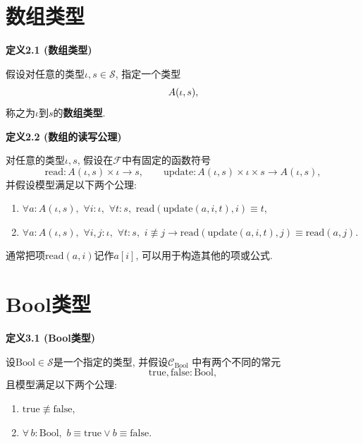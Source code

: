 \documentclass[UTF8]{ctexart}
\begin{document}
\section{数组类型}

\hypertarget{sec:定义2.1}{}
\noindent\textbf{定义2.1 (数组类型)}

假设对任意的类型$\iota,s\in\mathcal{S}$, 指定一个类型
\[
    A(\iota,s),\\[-3pt]
\]
称之为$\iota$到$s$的\textbf{数组类型}.

\vspace{10pt}

\hypertarget{sec:定义2.2}{}
\noindent\textbf{定义2.2 (数组的读写公理)}

对任意的类型$\iota,s$, 假设在$\mathcal{F}$中有固定的函数符号
\[
    \mathrm{read}:A(\iota,s)\times\iota\to s,\qquad
    \mathrm{update}:A(\iota,s)\times\iota\times s\to A(\iota,s),
\]
并假设模型满足以下两个公理:
\begin{enumerate}
    \item $\forall a:A(\iota,s),\,\,\forall i:\iota,\,\,\forall t:s,\,\,
    \mathrm{read}(\mathrm{update}(a,i,t),i)\equiv t$,
    \item $\forall a:A(\iota,s),\,\,\forall i,j:\iota,\,\,\forall t:s,\,\,
    i\not\equiv j\to\mathrm{read}(\mathrm{update}(a,i,t),j)
    \equiv\mathrm{read}(a,j)$.
\end{enumerate}

\vspace{10pt}

通常把项$\mathrm{read}(a,i)$记作$a[i]$, 可以用于构造其他的项或公式.

\vspace{10pt}

\section{Bool类型}

\hypertarget{sec:定义3.1}{}
\noindent\textbf{定义3.1 (Bool类型)}

设$\mathrm{Bool}\in\mathcal{S}$是一个指定的类型, 并假设$\mathcal{C}_{\mathrm{Bool}}$
中有两个不同的常元
\[
    \mathrm{true},\mathrm{false}:\mathrm{Bool},
\]
且模型满足以下两个公理:
\begin{enumerate}
    \item $\mathrm{true}\not\equiv\mathrm{false}$,
    \item $\forall\,b:\mathrm{Bool},\,\,
    b\equiv\mathrm{true}\lor b\equiv\mathrm{false}$.
\end{enumerate}
\end{document}
